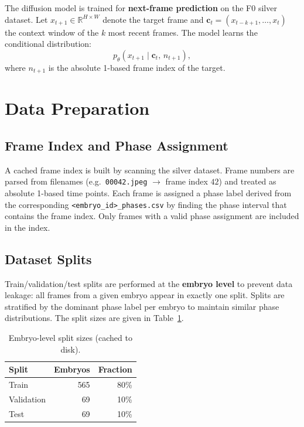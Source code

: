 \documentclass[12pt, a4paper, twoside]{report}
\newcommand{\R}{\mathbb{R}}
\begin{document}
The diffusion model is trained for \textbf{next-frame prediction} on the F$0$
silver dataset.
Let $x_{t+1} \in \R^{H \times W}$ denote the target frame and
$\mathbf{c}_t = (x_{t-k+1}, \ldots, x_t)$ the context window of the $k$
most recent frames.
The model learns the conditional distribution:
\[
  p_\theta(x_{t+1} \mid \mathbf{c}_t, \, n_{t+1}),
\]
where $n_{t+1}$ is the absolute 1-based frame index of the target.

\section{Data Preparation}
\label{sec:diff_data}

\subsection{Frame Index and Phase Assignment}
\label{ssec:diff_index}

A cached frame index is built by scanning the silver dataset.
Frame numbers are parsed from filenames (e.g.\ \texttt{00042.jpeg}
$\to$ frame index $42$) and treated as absolute 1-based time points.
Each frame is assigned a phase label derived from the corresponding
\texttt{<embryo\_id>\_phases.csv} by finding the phase interval that contains
the frame index.
Only frames with a valid phase assignment are included in the index.

\subsection{Dataset Splits}
\label{ssec:splits}

Train/validation/test splits are performed at the \textbf{embryo level} to
prevent data leakage: all frames from a given embryo appear in exactly one
split.
Splits are stratified by the dominant phase label per embryo to maintain
similar phase distributions.
The split sizes are given in Table~\ref{tab:splits}.

\begin{table}[H]
\centering
\caption{Embryo-level split sizes (cached to disk).}
\label{tab:splits}
\begin{tabular}{lrr}
\toprule
\textbf{Split} & \textbf{Embryos} & \textbf{Fraction} \\
\midrule
Train      & 565 & 80\% \\
Validation & 69  & 10\% \\
Test       & 69  & 10\% \\
\bottomrule
\end{tabular}
\end{table}
\end{document}
